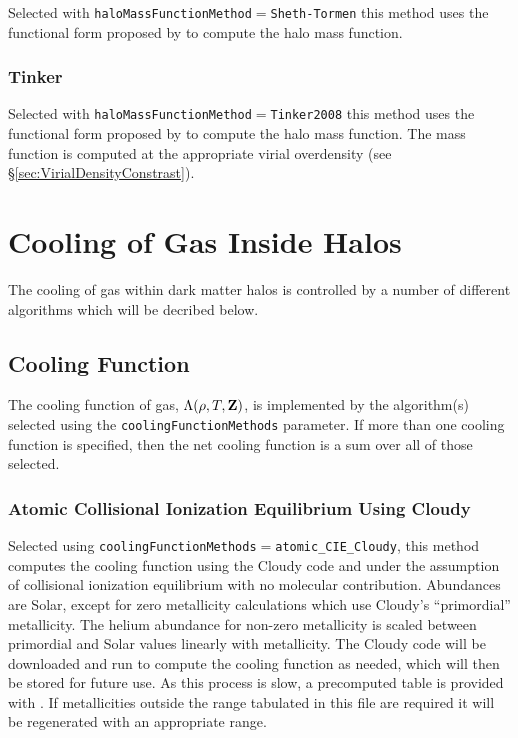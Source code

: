 Selected with {\tt haloMassFunctionMethod}$=${\tt Sheth-Tormen} this method uses the functional form proposed by \cite{sheth_ellipsoidal_2001} to compute the halo mass function.

\subsubsection{Tinker}

Selected with {\tt haloMassFunctionMethod}$=${\tt Tinker2008} this method uses the functional form proposed by \cite{tinker_towardhalo_2008} to compute the halo mass function. The mass function is computed at the appropriate virial overdensity (see \S\ref{sec:VirialDensityConstrast}).

\section{Cooling of Gas Inside Halos}

The cooling of gas within dark matter halos is controlled by a number of different algorithms which will be decribed below.

\subsection{Cooling Function}

The cooling function of gas, $\Lambda(\rho,T,{\bf Z})$, is implemented by the algorithm(s) selected using the {\tt coolingFunctionMethods} parameter. If more than one cooling function is specified, then the net cooling function is a sum over all of those selected.

\subsubsection{Atomic Collisional Ionization Equilibrium Using {\sc Cloudy}}

Selected using {\tt coolingFunctionMethods}$=${\tt atomic\_CIE\_Cloudy}, this method computes the cooling function using the {\sc Cloudy} code and under the assumption of collisional ionization equilibrium with no molecular contribution. Abundances are Solar, except for zero metallicity calculations which use {\sc Cloudy}'s ``primordial'' metallicity. The helium abundance for non-zero metallicity is scaled between primordial and Solar values linearly with metallicity. The {\sc Cloudy} code will be downloaded and run to compute the cooling function as needed, which will then be stored for future use. As this process is slow, a precomputed table is provided with \glc. If metallicities outside the range tabulated in this file are required it will be regenerated with an appropriate range.

